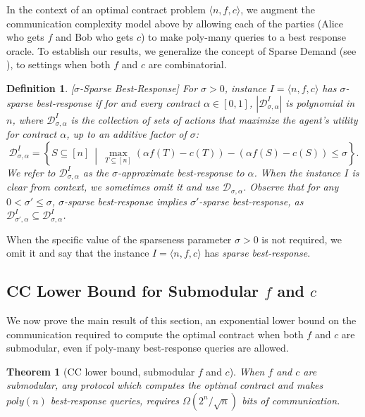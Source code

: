 \documentclass[11pt]{article}
\newtheorem{theorem}{Theorem}
\newtheorem{definition}{Definition}
\newcommand{\instance}{\langle n, f, c \rangle}
\newcommand{\instanceI}{I=\langle n, f, c \rangle}
\newcommand{\demand}[2]{\mathcal{D}_{{#1},{#2}}}
\newcommand{\BR}[3]{\demand{#1}{#2}^{#3}}
\newcommand{\BRI}[2]{\BR{#1}{#2}{I}}
\newcommand{\BrSigAlpha}{\BRI{\sigma}{\alpha}}
\begin{document}
In the context of an optimal contract problem $\instance$, we augment the communication complexity model above by allowing each of the parties (Alice who gets $f$ and Bob who gets $c$) to make poly-many queries to a best response oracle.
To establish our results, we generalize the concept of Sparse Demand (see ), to settings when both $f$ and $c$ are combinatorial.

\begin{definition}\label{def:sparseBestREsponse}[$\sigma$-Sparse Best-Response]
For $\sigma >0$, instance $\instanceI$ has $\sigma$-sparse best-response if for and every contract $\alpha \in [0,1]$, $|\BrSigAlpha|$ is polynomial in $n$, where $\BrSigAlpha$ is the collection of sets of actions that maximize the agent's utility for contract $\alpha$, up to an additive factor of $\sigma$:
$$
\BrSigAlpha = \left\{ S\subseteq [n] ~\middle|~ \max_{T\subseteq [n]} (\alpha f(T) - c(T)) - \left(\alpha f(S) - c(S)\right) \le \sigma \right\}.
$$
We refer to $\BrSigAlpha$ as the $\sigma$-approximate best-response to $\alpha$.
When the instance $I$ is clear from context, we sometimes omit it and use $\demand{\sigma}{\alpha}$.
Observe that for any $0 < \sigma' \le \sigma$, $\sigma$-sparse best-response implies $\sigma'$-sparse best-response, as $\BRI{\sigma'}{\alpha} \subseteq \BrSigAlpha$.
\end{definition}
When the specific value of the sparseness parameter $\sigma>0$ is not required, we omit it and say that the instance $\instanceI$ has \textit{sparse best-response}.


\subsection{CC Lower Bound for Submodular $f$ and $c$}\label{subsec:cc_lower_bound_submod_fc}

We now prove the main result of this section, an exponential lower bound on the communication required to compute the optimal contract when both $f$ and $c$ are submodular, even if poly-many best-response queries are allowed.
\begin{theorem}[CC lower bound, submodular $f$ and $c$]\label{thm:cc_submod_f_c}
    When $f$ and $c$ are submodular, any protocol which computes the optimal contract and makes $poly(n)$ best-response queries, requires $\Omega(2^n/\sqrt{n})$ bits of communication.
\end{theorem}
\end{document}
